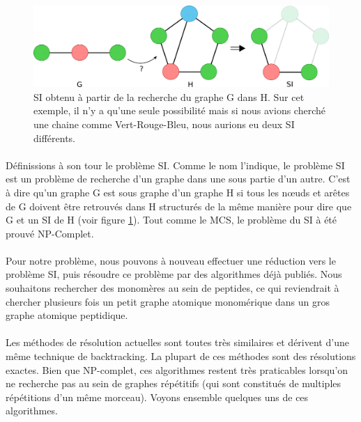 \documentclass[12pt,french,twoside]{report}
\begin{document}
\begin{figure}[!ht]
  \begin{center}
    \includegraphics[width=450px]{Figures/s2m/MCS-SI/si.png}
    \caption{\label{SI_fig}SI obtenu à partir de la recherche du graphe G dans H.
    Sur cet exemple, il n'y a qu'une seule possibilité mais si nous avions cherché une chaine comme Vert-Rouge-Bleu, nous aurions eu deux SI différents.}
  \end{center}
\end{figure}

\paragraph{}Définissions à son tour le problème SI.
Comme le nom l'indique, le problème SI est un problème de recherche d'un graphe dans une sous partie d'un autre.
C'est à dire qu'un graphe G est sous graphe d'un graphe H si tous les n\oe{}uds et arêtes de G doivent être retrouvés dans H structurés de la même manière pour dire que G et un SI de H (voir figure \ref{SI_fig}).
Tout comme le MCS, le problème du SI à été prouvé NP-Complet\cite{garey_computers_1979}.

\paragraph{}Pour notre problème, nous pouvons à nouveau effectuer une réduction vers le problème SI, puis résoudre ce problème par des algorithmes déjà publiés.
Nous souhaitons rechercher des monomères au sein de peptides, ce qui reviendrait à chercher plusieurs fois un petit graphe atomique monomérique dans un gros graphe atomique peptidique.

\paragraph{}Les méthodes de résolution actuelles sont toutes très similaires et dérivent d'une même technique de backtracking.
La plupart de ces méthodes sont des résolutions exactes.
Bien que NP-complet, ces algorithmes restent très praticables lorsqu'on ne recherche pas au sein de graphes répétitifs (qui sont constitués de multiples répétitions d'un même morceau).
Voyons ensemble quelques uns de ces algorithmes.
\end{document}

